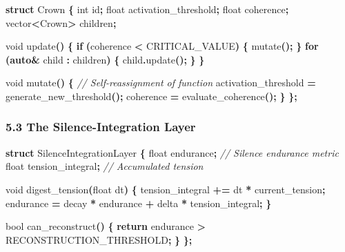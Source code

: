 \documentclass[
  11pt,
  a4paper,
]{article}
\newenvironment{Shaded}{\begin{snugshade}}{\end{snugshade}}
\newcommand{\CommentTok}[1]{\textcolor[rgb]{0.56,0.35,0.01}{\textit{#1}}}
\newcommand{\ControlFlowTok}[1]{\textcolor[rgb]{0.13,0.29,0.53}{\textbf{#1}}}
\newcommand{\DataTypeTok}[1]{\textcolor[rgb]{0.13,0.29,0.53}{#1}}
\newcommand{\KeywordTok}[1]{\textcolor[rgb]{0.13,0.29,0.53}{\textbf{#1}}}
\newcommand{\NormalTok}[1]{#1}
\newcommand{\OperatorTok}[1]{\textcolor[rgb]{0.81,0.36,0.00}{\textbf{#1}}}
\begin{document}
\begin{Shaded}
\begin{Highlighting}[]
\KeywordTok{struct}\NormalTok{ Crown }\OperatorTok{\{}
    \DataTypeTok{int}\NormalTok{ id}\OperatorTok{;}
    \DataTypeTok{float}\NormalTok{ activation\_threshold}\OperatorTok{;}
    \DataTypeTok{float}\NormalTok{ coherence}\OperatorTok{;}
\NormalTok{    vector}\OperatorTok{\textless{}}\NormalTok{Crown}\OperatorTok{\textgreater{}}\NormalTok{ children}\OperatorTok{;}
    
    \DataTypeTok{void}\NormalTok{ update}\OperatorTok{()} \OperatorTok{\{}
        \ControlFlowTok{if} \OperatorTok{(}\NormalTok{coherence }\OperatorTok{\textless{}}\NormalTok{ CRITICAL\_VALUE}\OperatorTok{)} \OperatorTok{\{}
\NormalTok{            mutate}\OperatorTok{();}
        \OperatorTok{\}}
        \ControlFlowTok{for} \OperatorTok{(}\KeywordTok{auto}\OperatorTok{\&}\NormalTok{ child }\OperatorTok{:}\NormalTok{ children}\OperatorTok{)} \OperatorTok{\{}
\NormalTok{            child}\OperatorTok{.}\NormalTok{update}\OperatorTok{();}
        \OperatorTok{\}}
    \OperatorTok{\}}
    
    \DataTypeTok{void}\NormalTok{ mutate}\OperatorTok{()} \OperatorTok{\{}
        \CommentTok{// Self{-}reassignment of function}
\NormalTok{        activation\_threshold }\OperatorTok{=}\NormalTok{ generate\_new\_threshold}\OperatorTok{();}
\NormalTok{        coherence }\OperatorTok{=}\NormalTok{ evaluate\_coherence}\OperatorTok{();}
    \OperatorTok{\}}
\OperatorTok{\};}
\end{Highlighting}
\end{Shaded}

\subsubsection{5.3 The Silence-Integration
Layer}\label{the-silence-integration-layer}

\begin{Shaded}
\begin{Highlighting}[]
\KeywordTok{struct}\NormalTok{ SilenceIntegrationLayer }\OperatorTok{\{}
    \DataTypeTok{float}\NormalTok{ endurance}\OperatorTok{;}         \CommentTok{// Silence endurance metric}
    \DataTypeTok{float}\NormalTok{ tension\_integral}\OperatorTok{;}  \CommentTok{// Accumulated tension}
    
    \DataTypeTok{void}\NormalTok{ digest\_tension}\OperatorTok{(}\DataTypeTok{float}\NormalTok{ dt}\OperatorTok{)} \OperatorTok{\{}
\NormalTok{        tension\_integral }\OperatorTok{+=}\NormalTok{ dt }\OperatorTok{*}\NormalTok{ current\_tension}\OperatorTok{;}
\NormalTok{        endurance }\OperatorTok{=}\NormalTok{ decay }\OperatorTok{*}\NormalTok{ endurance }\OperatorTok{+}\NormalTok{ delta }\OperatorTok{*}\NormalTok{ tension\_integral}\OperatorTok{;}
    \OperatorTok{\}}
    
    \DataTypeTok{bool}\NormalTok{ can\_reconstruct}\OperatorTok{()} \OperatorTok{\{}
        \ControlFlowTok{return}\NormalTok{ endurance }\OperatorTok{\textgreater{}}\NormalTok{ RECONSTRUCTION\_THRESHOLD}\OperatorTok{;}
    \OperatorTok{\}}
\OperatorTok{\};}
\end{Highlighting}
\end{Shaded}
\end{document}
